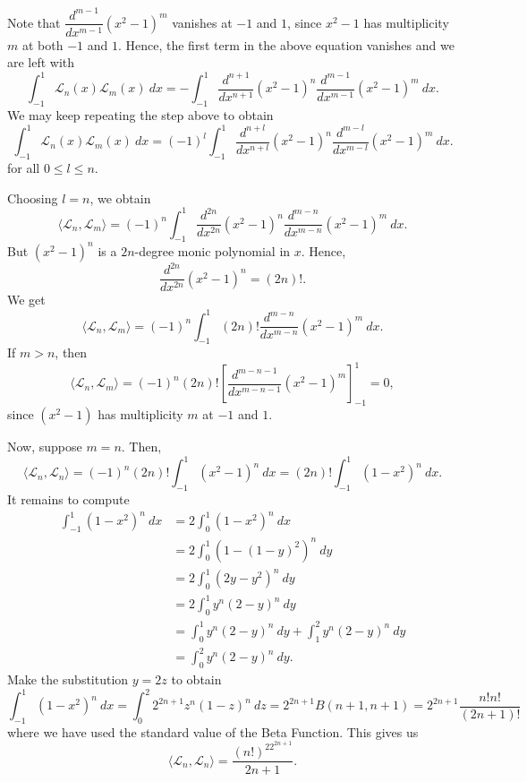 \documentclass[12pt]{amsart}
\newcommand{\calL}{\mathcal{L}}
\begin{document}
Note that $\dfrac{d^{m - 1}}{dx^{m - 1}}(x^2 - 1)^m$ vanishes at $-1$ and $1$, since $x^2 - 1$ has multiplicity $m$ at both $-1$ and $1$. Hence, the first term in the above equation vanishes and we are left with 
\begin{equation*}
	\int_{-1}^1\calL_n(x)\calL_m(x)~dx = -\int_{-1}^1 \frac{d^{n + 1}}{dx^{n + 1}}(x^2 - 1)^n\frac{d^{m - 1}}{dx^{m - 1}}(x^2 - 1)^m~dx.
\end{equation*}
We may keep repeating the step above to obtain 
\begin{equation*}
	\int_{-1}^1\calL_n(x)\calL_m(x)~dx = (-1)^l\int_{-1}^1\frac{d^{n + l}}{dx^{n + l}}(x^2 - 1)^n\frac{d^{m - l}}{dx^{m - l}}(x^2 - 1)^m~dx.
\end{equation*}
for all $0\le l\le n$.

Choosing $l = n$, we obtain 
\begin{equation*}
	\langle\calL_n,\calL_m\rangle = (-1)^n \int_{-1}^1\frac{d^{2n}}{dx^{2n}}(x^2 - 1)^n\frac{d^{m - n}}{dx^{m - n}}(x^2 - 1)^m~dx.
\end{equation*}
But $(x^2 - 1)^n$ is a $2n$-degree monic polynomial in $x$. Hence, 
\begin{equation*}
	\frac{d^{2n}}{dx^{2n}}(x^2 - 1)^n = (2n)!.
\end{equation*}
We get 
\begin{equation*}
	\langle\calL_n,\calL_m\rangle = (-1)^n\int_{-1}^1 (2n)!\frac{d^{m - n}}{dx^{m - n}}(x^2 - 1)^m~dx.
\end{equation*}
If $m > n$, then 
\begin{equation*}
	\langle\calL_n,\calL_m\rangle = (-1)^n(2n)!\left[\frac{d^{m - n - 1}}{dx^{m - n - 1}}(x^2 - 1)^m\right]_{-1}^1 = 0,
\end{equation*}
since $(x^2 - 1)$ has multiplicity $m$ at $-1$ and $1$.

Now, suppose $m = n$. Then, 
\begin{equation*}
	\langle\calL_n,\calL_n\rangle = (-1)^n (2n)!\int_{-1}^1 (x^2 - 1)^n~dx = (2n)!\int_{-1}^1 (1 - x^2)^n~dx.
\end{equation*}
It remains to compute 
\begin{align*}
	\int_{-1}^1 (1 - x^2)^n~dx &= 2\int_{0}^1 (1 - x^2)^n~dx\\
	&= 2\int_{0}^1 (1 - (1 - y)^2)^n~dy\\
	&= 2\int_0^1 (2y - y^2)^n~dy\\
	&= 2\int_0^1 y^n(2 - y)^n~dy\\
	&= \int_0^1 y^n(2 - y)^n~dy + \int_1^2 y^n(2 - y)^n~dy\\
	&= \int_0^2 y^n(2 - y)^n~dy.
\end{align*}
Make the substitution $y = 2z$ to obtain 
\begin{equation*}
	\int_{-1}^1 (1 - x^2)^n~dx = \int_0^2 2^{2n + 1}z^n(1 - z)^n~dz = 2^{2n + 1}B(n + 1, n + 1) = 2^{2n + 1}\frac{n!n!}{(2n + 1)!}
\end{equation*}
where we have used the standard value of the Beta Function. This gives us 
\begin{equation*}
	\langle\calL_n,\calL_n\rangle = \frac{(n!)^22^{2n + 1}}{2n + 1}.
\end{equation*}
\end{document}
